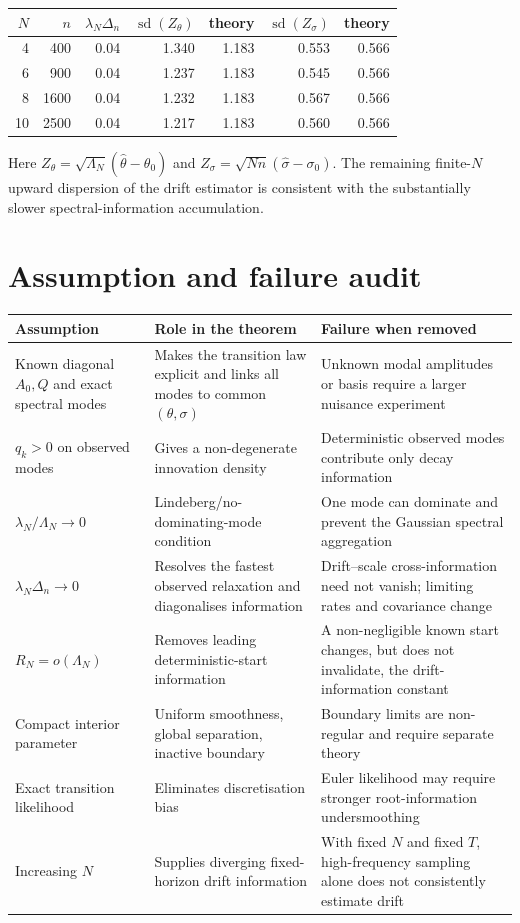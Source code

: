 \documentclass[11pt]{article}
\theoremstyle{remark}
\newcommand{\1}{\mathbf 1}
\newcommand{\LamN}{\Lambda_N}
\begin{document}
\begin{center}
\begin{tabular}{rrrrrrr}
\toprule
$N$ & $n$ & $\lambda_N\Delta_n$ & $\operatorname{sd}(Z_\theta)$ & theory & $\operatorname{sd}(Z_\sigma)$ & theory\\
\midrule
4  & 400  & 0.04 & 1.340 & 1.183 & 0.553 & 0.566\\
6  & 900  & 0.04 & 1.237 & 1.183 & 0.545 & 0.566\\
8  & 1600 & 0.04 & 1.232 & 1.183 & 0.567 & 0.566\\
10 & 2500 & 0.04 & 1.217 & 1.183 & 0.560 & 0.566\\
\bottomrule
\end{tabular}
\end{center}
Here $Z_\theta=\sqrt{\LamN}(\widehat\theta-\theta_0)$ and
$Z_\sigma=\sqrt{Nn}(\widehat\sigma-\sigma_0)$.  The remaining finite-$N$ upward dispersion of the drift estimator is consistent with the substantially slower spectral-information accumulation.

\section{Assumption and failure audit}

\renewcommand{\arraystretch}{1.18}
\begin{tabularx}{\textwidth}{>{\raggedright\arraybackslash}p{} X X}
\toprule
Assumption & Role in the theorem & Failure when removed\\
\midrule
Known diagonal $A_0,Q$ and exact spectral modes & Makes the transition law explicit and links all modes to common $(\theta,\sigma)$ & Unknown modal amplitudes or basis require a larger nuisance experiment\\
$q_k>0$ on observed modes & Gives a non-degenerate innovation density & Deterministic observed modes contribute only decay information\\
$\lambda_N/\LamN\to0$ & Lindeberg/no-dominating-mode condition & One mode can dominate and prevent the Gaussian spectral aggregation\\
$\lambda_N\Delta_n\to0$ & Resolves the fastest observed relaxation and diagonalises information & Drift--scale cross-information need not vanish; limiting rates and covariance change\\
$R_N=o(\LamN)$ & Removes leading deterministic-start information & A non-negligible known start changes, but does not invalidate, the drift-information constant\\
Compact interior parameter & Uniform smoothness, global separation, inactive boundary & Boundary limits are non-regular and require separate theory\\
Exact transition likelihood & Eliminates discretisation bias & Euler likelihood may require stronger root-information undersmoothing\\
Increasing $N$ & Supplies diverging fixed-horizon drift information & With fixed $N$ and fixed $T$, high-frequency sampling alone does not consistently estimate drift\\
\bottomrule
\end{tabularx}
\end{document}
